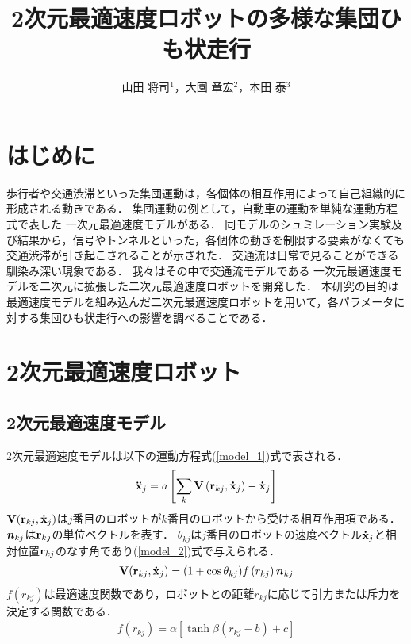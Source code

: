 \documentclass[twocolumn]{jarticle} %
\title{%
2次元最適速度ロボットの多様な集団ひも状走行
}
\author{%
山田 将司$^1$，大園 章宏$^2$，本田 泰$^3$
}
\affiliation{%
$^1$ 室蘭工業大学 工学部 情報電子工学系学科\\
$^2$ 室蘭工業大学 工学研究科 情報電子工学系専攻\\
$^3$ 室蘭工業大学大学院 しくみ解明系領域
}
\begin{document}
\maketitle
\section{はじめに}
歩行者や交通渋滞といった集団運動は，各個体の相互作用によって自己組織的に形成される動きである．
集団運動の例として，自動車の運動を単純な運動方程式で表した 一次元最適速度モデルがある．
同モデルのシュミレーション実験及び結果から，信号やトンネルといった，各個体の動きを制限する要素がなくても交通渋滞が引き起こされることが示された\cite{zyutai_1}．
交通流は日常で見ることができる馴染み深い現象である．
我々はその中で交通流モデルである 一次元最適速度モデルを二次元に拡張した二次元最適速度ロボットを開発した．
本研究の目的は最適速度モデルを組み込んだ二次元最適速度ロボットを用いて，各パラメータに対する集団ひも状走行への影響を調べることである．
\section{2次元最適速度ロボット}
\vspace{1mm}
\subsection{2次元最適速度モデル}
\vspace{1mm}
2次元最適速度モデルは以下の運動方程式(\ref{model_1})式で表される\cite{2014}\cite{2016}．
\begin{eqnarray}
{\bf \ddot{x}}_{j} = a\left[ \sum_{k} {\bf V} \left({\bf r}_{kj},{\bf \dot{x}}_{j}\right) - {\bf \dot{x}}_{j} \right]
\label{model_1}
\end{eqnarray}
$ {\bf V}({\bf r}_{kj},{\bf \dot{x}}_{j}) $は$j$番目のロボットが$k$番目のロボットから受ける相互作用項である．
$\mbox{\boldmath $n$}_{kj}$は${\bf r}_{kj}$の単位ベクトルを表す．
$\theta_{kj}$は$j$番目のロボットの速度ベクトル${\bf \dot{x}}_j$と相対位置${\bf r}_{kj}$のなす角であり(\ref{model_2})式で与えられる．
\begin{eqnarray}
{\bf V}({\bf {r}}_{kj} , {\bf \dot{x}}_j) = (1+\cos\theta_{kj}) f\left(r_{kj}\right)  \mbox{\boldmath $n$}_{kj}
\label{model_2}
\end{eqnarray}
$f(r_{kj})$は最適速度関数であり，ロボットとの距離$r_{kj}$に応じて引力または斥力を決定する関数である．
\begin{eqnarray}
f(r_{kj}) = \alpha  \left[ \tanh\beta(r_{kj} - b ) + c \right]
\label{model_3}
\end{eqnarray}
\vspace{-2mm}
\end{document}
